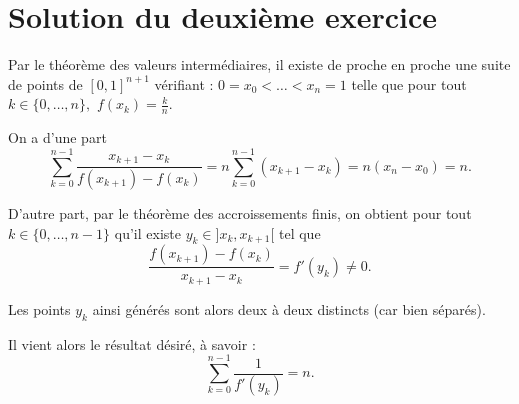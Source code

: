



\section{Solution du deuxième exercice}

Par le théorème des valeurs intermédiaires, il existe de proche en proche une suite de points de $[0,1]^{n+1}$ vérifiant : $0=x_{0}<\ldots<x_{n}=1$ telle que pour tout $k\in\{0,\ldots,n\},$ $\displaystyle f(x_{k})=\frac{k}{n}.$

On a d'une part $$\sum_{k=0}^{n-1}\frac{x_{k+1}-x_{k}}{f(x_{k+1})-f(x_{k})}=n\sum_{k=0}^{n-1}\left(x_{k+1}-x_{k}\right)=n(x_{n}-x_{0})=n.$$

D'autre part, par le théorème des accroissements finis, on obtient pour tout $k\in\{0,\ldots,n-1\}$ qu'il existe $y_{k}\in ]x_{k},x_{k+1}[$ tel que $$\frac{f(x_{k+1})-f(x_{k})}{x_{k+1}-x_{k}}=f'(y_{k})\neq 0.$$

Les points $y_{k}$ ainsi générés sont alors deux à deux distincts (car bien séparés).

Il vient alors le résultat désiré, à savoir : $$\sum_{k=0}^{n-1}\frac{1}{f'(y_{k})}=n.$$